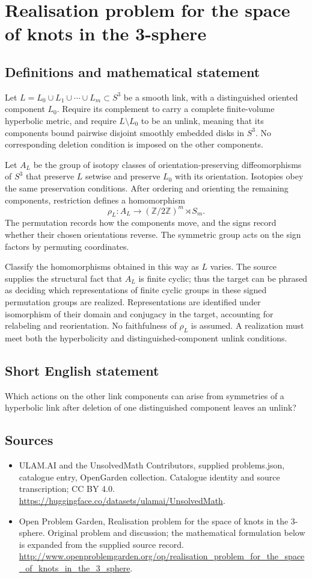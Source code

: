 \documentclass[11pt,a4paper]{article}
\begin{document}
\section*{Realisation problem for the space of knots in the 3-sphere}\label{statement}

\subsection{Definitions and mathematical statement}
Let $L=L_0\cup L_1\cup\cdots\cup L_m\subset S^3$ be a smooth link,
with a distinguished oriented component $L_0$. Require its complement
to carry a complete finite-volume hyperbolic metric, and require
$L\setminus L_0$ to be an unlink, meaning that its components bound
pairwise disjoint smoothly embedded disks in $S^3$. No corresponding
deletion condition is imposed on the other components.

Let $A_L$ be the group of isotopy classes of orientation-preserving
diffeomorphisms of $S^3$ that preserve $L$ setwise and preserve $L_0$
with its orientation. Isotopies obey the same preservation conditions.
After ordering and orienting the remaining components, restriction
defines a homomorphism
\[
 \rho_L:A_L\longrightarrow (\mathbb Z/2\mathbb Z)^m\rtimes S_m.
\]
The permutation records how the components move, and the signs record
whether their chosen orientations reverse. The symmetric group acts
on the sign factors by permuting coordinates.

Classify the homomorphisms obtained in this way as $L$ varies.
The source supplies the structural fact that $A_L$ is finite cyclic;
thus the target can be phrased as deciding which representations of
finite cyclic groups in these signed permutation groups are realized.
Representations are identified under isomorphism of their domain and
conjugacy in the target, accounting for relabeling and reorientation.
No faithfulness of $\rho_L$ is assumed. A realization must meet both
the hyperbolicity and distinguished-component unlink conditions.
\subsection{Short English statement}
Which actions on the other link components can arise from symmetries of a hyperbolic link after deletion of one distinguished component leaves an unlink?
\subsection{Sources}
\begin{itemize}
\item[S1] ULAM.AI and the UnsolvedMath Contributors, supplied problems.json, catalogue entry, OpenGarden collection. Catalogue identity and source transcription; CC BY 4.0.
\url{https://huggingface.co/datasets/ulamai/UnsolvedMath}.
\item[S2] Open Problem Garden, Realisation problem for the space of knots in the 3-sphere. Original problem and discussion; the mathematical formulation below is expanded from the supplied source record.
\url{http://www.openproblemgarden.org/op/realisation_problem_for_the_space_of_knots_in_the_3_sphere}.
\end{itemize}
\end{document}
